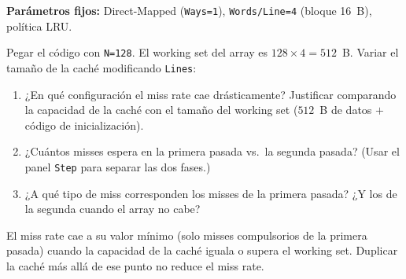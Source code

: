 \documentclass[12pt, a4paper]{article}
\newcommand{\ripesbtn}[1]{\texttt{#1}}
\begin{document}
\newpage
\begin{ejercicio}
    \textbf{Parámetros fijos:} Direct-Mapped (\texttt{Ways=1}),
    \texttt{Words/Line=4} (bloque 16~B), política LRU.

    Pegar el código con \texttt{N=128}. El working set del array es $128 \times 4 = 512$~B.
    Variar el tamaño de la caché modificando \ripesbtn{Lines}:

    \vspace{0.3cm}
    \begin{center}
    \renewcommand{\arraystretch}{1.8}
    \end{center}

    \vspace{0.2cm}
    \begin{enumerate}
        \item ¿En qué configuración el miss rate cae drásticamente? Justificar
              comparando la capacidad de la caché con el tamaño del working set
              ($512$~B de datos $+$ código de inicialización).
        \item ¿Cuántos misses espera en la primera pasada vs.\ la segunda pasada?
              (Usar el panel \ripesbtn{Step} para separar las dos fases.)
        \item ¿A qué tipo de miss corresponden los misses de la primera pasada?
              ¿Y los de la segunda cuando el array no cabe?
    \end{enumerate}
\end{ejercicio}

\begin{conclusion}
    El miss rate cae a su valor mínimo (solo misses compulsorios de la primera pasada)
    cuando la capacidad de la caché iguala o supera el working set.
    Duplicar la caché más allá de ese punto no reduce el miss rate.
\end{conclusion}
\end{document}
